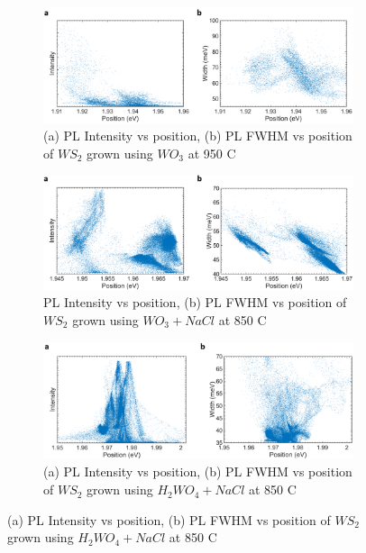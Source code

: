 \begin{figure}[!h]
	\begin{center}
		\begin{subfigure}[b]{0.8\textwidth}
			\includegraphics[scale=0.3]{PaperSIScatterWO3.png}
			\caption{(a) PL Intensity vs position, (b) PL FWHM vs position of $WS_2$ grown using $WO_3$ at 950 {\degree}C}
			\label{fig:PaperSIScatterWO3}
		\end{subfigure}

		\begin{subfigure}[b]{0.8\textwidth}
			\includegraphics[scale=0.3]{PaperSIScatterWO3NaCl.png}
			\caption{PL Intensity vs position, (b) PL FWHM vs position of $WS_2$ grown using $WO_3+NaCl$ at 850 {\degree}C}
			\label{fig:PaperSIScatterWO3NaCl}
		\end{subfigure}

		\begin{subfigure}[b]{0.8\textwidth}
			\includegraphics[scale=0.3]{PaperSIScatterH2WO4NaCl.png}
			\caption{(a) PL Intensity vs position, (b) PL FWHM vs position of $WS_2$ grown using $H_2WO_4+NaCl$ at 850 {\degree}C}
			\label{fig:PaperSIScatterH2WO4NaCl}
		\end{subfigure}


\end{center}
\end{figure}
